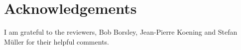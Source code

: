 \section*{Acknowledgements}

I am grateful to the reviewers, Bob Borsley, Jean-Pierre Koening and Stefan Müller for their helpful comments.
{\sloppy
\printbibliography[heading=subbibliography,notkeyword=this] 
}




